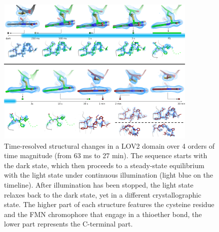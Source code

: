 \begin{figure}[H] %
    \centering
    \noindent \includegraphics[width=\textwidth]{images/Introduction/Figure6_LOV2.pdf}
    \hfill
    \caption{Time-resolved structural changes in a LOV2 domain over 4 orders of time magnitude (from 63 ms to 27 min). The sequence starts with the dark state, which then proceeds to a steady-state equilibrium with the light state under continuous illumination (light blue on the timeline). After illumination has been stopped, the light state relaxes back to the dark state, yet in a different crystallographic state. The higher part of each structure features the cysteine residue and the FMN chromophore that engage in a thioether bond, the lower part represents the C-terminal part.}
    \label{fig:Figure6}
\end{figure}

